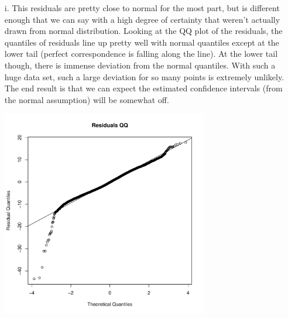 \documentclass[11pt]{article}
\theoremstyle{definition}
\begin{document}
\begin{itemize}
\begin{itemize}
                \begin{itemize}
                    \item[i.]
                        This residuals are pretty close to normal for the most part, but is different enough that we can say with a high degree of certainty that weren't actually drawn from normal distribution. Looking at the QQ plot of the residuals, the quantiles of residuals line up pretty well with normal quantiles except at the lower tail (perfect correspondence is falling along the line). At the lower tail though, there is immense deviation from the normal quantiles. With such a huge data set, such a large deviation for so many points is extremely unlikely. The end result is that we can expect the estimated confidence intervals (from the normal assumption) will be somewhat off.
                        \begin{center}
                            \includegraphics[width=9cm]{final/2ai_qq} 
                        \end{center}


\end{itemize}
\end{itemize}
\end{itemize}
\end{document}

